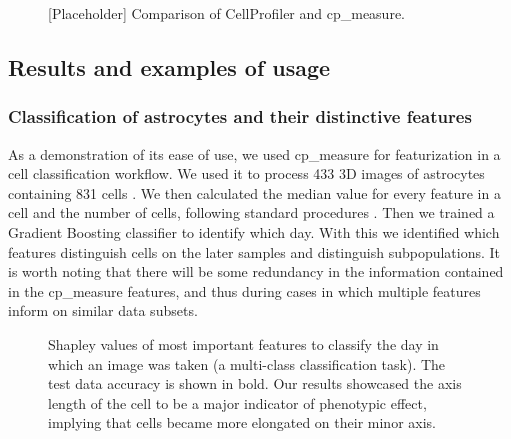 \documentclass{article}
\begin{document}
\begin{figure}[htbp]
\centering

\caption{\label{fig:org7fe862f}{[}Placeholder] Comparison of CellProfiler and cp\_measure.}
\end{figure}
\subsection{Results and examples of usage}
\label{sec:org8ef524e}
\subsubsection{Classification of astrocytes and their distinctive features}
\label{sec:org3d97e6f}

As a demonstration of its ease of use, we used cp\_measure for featurization in a cell classification workflow. We used it to process 433 3D images of astrocytes containing 831 cells \citep{kalinin3DCellNuclear2018}. We then calculated the median value for every feature in a cell and the number of cells, following standard procedures \citep{caicedoDataanalysisStrategiesImagebased2017}. Then we trained a Gradient Boosting classifier to identify which day. With this we identified which features distinguish cells on the later samples and distinguish subpopulations. It is worth noting that there will be some redundancy in the information contained in the cp\_measure features, and thus during cases in which multiple features inform on similar data subsets.

\begin{figure}[htbp]
\centering

\caption{\label{fig:org4620d4d}Shapley values of most important features to classify the day in which an image was taken (a multi-class classification task). The test data accuracy is shown in bold. Our results showcased the axis length of the cell to be a major indicator of phenotypic effect, implying that cells became more elongated on their minor axis.}
\end{figure}
\end{document}
